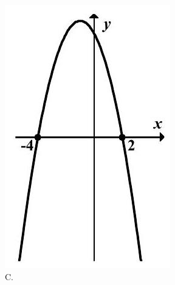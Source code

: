 \documentclass[10pt]{article}
\begin{document}
\includegraphics[max width=\textwidth, center]{2024_11_21_5b6b7ffa9006e3f448adg-04(3)}\\
C.\\
\end{document}
